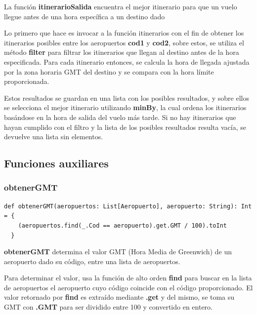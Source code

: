 \documentclass[letterpaper]{article}
\begin{document}
La función \textbf{itinerarioSalida} encuentra el mejor itinerario para que un vuelo llegue antes de una hora específica a un destino dado

Lo primero que hace es invocar a la función itinerarios con el fin de obtener los itinerarios posibles entre los aeropuertos \textbf{cod1} y \textbf{cod2}, sobre estos, se utiliza el método \textbf{filter} para filtrar los itinerarios que llegan al destino antes de la hora especificada. Para cada itinerario entonces, se calcula la hora de llegada ajustada por la zona horaria GMT del destino y se compara con la hora límite proporcionada.

Estos resultados se guardan en una lista con los posibles resultados, y sobre ellos se selecciona el mejor itinerario utilizando \textbf{minBy}, la cual ordena los itinerarios basándose en la hora de salida del vuelo más tarde. Si no hay itinerarios que hayan cumplido con el filtro y la lista de los posibles resultados resulta vacía, se devuelve una lista sin elementos.

\subsection{Funciones auxiliares}
\subsubsection{obtenerGMT}
\begin{lstlisting}[caption={Función para obtener el GMT de un aeropuerto}, label={lst:obtenerGMT}, captionpos=b]
  def obtenerGMT(aeropuertos: List[Aeropuerto], aeropuerto: String): Int = {
    (aeropuertos.find(_.Cod == aeropuerto).get.GMT / 100).toInt
  }
\end{lstlisting}

\textbf{obtenerGMT} determina el valor GMT (Hora Media de Greenwich) de un aeropuerto dado su código, entre una lista de aeropuertos.

Para determinar el valor, usa la función de alto orden \textbf{find} para buscar en la lista de aeropuertos el aeropuerto cuyo código coincide con el código proporcionado.  El valor retornado por \textbf{find} es extraído mediante \textbf{.get} y del mismo, se toma su GMT con \textbf{.GMT} para ser dividido entre 100 y convertido en entero.
\end{document}
